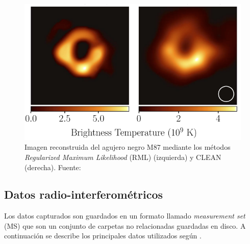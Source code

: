\begin{figure}[!ht]
	\centering
	\captionsetup{justification=centering}
	\includegraphics[scale=0.6]{images/Black_hole.png}
	\caption[Imagen reconstruida de agujero negro M87.]{Imagen reconstruida del agujero negro M87 mediante los métodos \textit{Regularized Maximum Likelihood} (RML) (izquierda) y CLEAN (derecha). Fuente: \citep{m87_image}}
	\label{fig:m87}
\end{figure}


\subsection{Datos radio-interferométricos}

Los datos capturados son guardados en un formato llamado \textit{measurement set} (MS) que son un conjunto de carpetas no relacionadas guardadas en disco. A continuación se describe los principales datos utilizados según \citep{kemball2000measurementset}.


